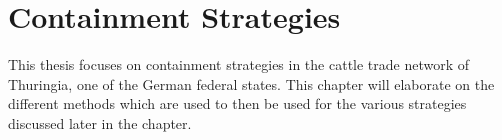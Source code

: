 
\section{Containment Strategies}\label{chap:containmentBasics}
This thesis focuses on containment strategies in the cattle trade network of Thuringia, one of the German federal states. This chapter will elaborate on the different methods which are used to then be used for the various strategies discussed later in the chapter.










